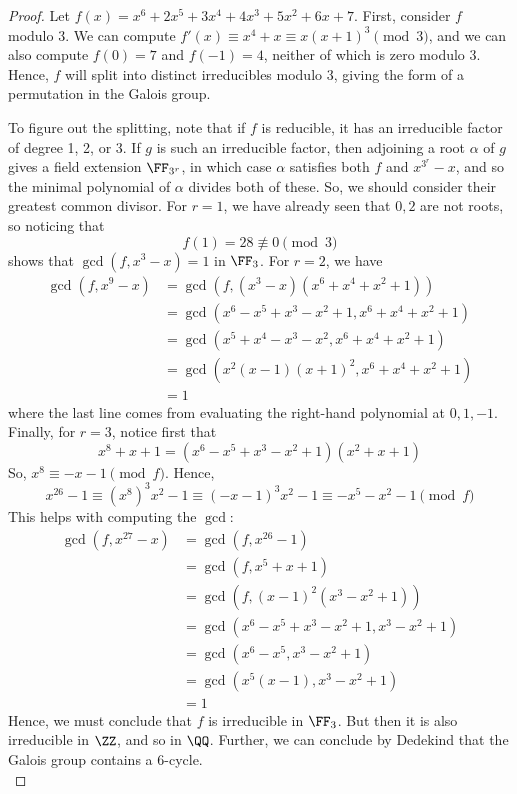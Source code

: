 \begin{proof}
	Let $f(x) = x^6+2x^5+3x^4+4x^3+5x^2+6x+7$. First, consider $f$ modulo 3. We can compute $f'(x) \equiv x^4+x \equiv x(x+1)^3 \pmod{3}$, and we can also compute $f(0) = 7$ and $f(-1) = 4$, neither of which is zero modulo $3$. Hence, $f$ will split into distinct irreducibles modulo 3, giving the form of a permutation in the Galois group.
	
	To figure out the splitting, note that if $f$ is reducible, it has an irreducible factor of degree 1, 2, or 3. If $g$ is such an irreducible factor, then adjoining a root $\alpha$ of $g$ gives a field extension $\FF_{3^r}$, in which case $\alpha$ satisfies both $f$ and $x^{3^r}-x$, and so the minimal polynomial of $\alpha$ divides both of these. So, we should consider their greatest common divisor. For $r=1$, we have already seen that $0,2$ are not roots, so noticing that
	\[ f(1) = 28 \not\equiv 0 \pmod{3} \]
	shows that $\gcd(f,x^3-x) = 1$ in $\FF_3$. For $r=2$, we have
	\begin{align*}
	\gcd(f,x^9-x)
		&= \gcd(f,(x^3-x)(x^6+x^4+x^2+1)) \\
		&= \gcd(x^6-x^5+x^3-x^2+1,x^6+x^4+x^2+1) \\
		&= \gcd(x^5+x^4-x^3-x^2,x^6+x^4+x^2+1) \\
		&= \gcd(x^2(x-1)(x+1)^2,x^6+x^4+x^2+1) \\
		&= 1
	\end{align*}
	where the last line comes from evaluating the right-hand polynomial at $0,1,-1$. Finally, for $r=3$, notice first that
	\[ x^8+x+1 = (x^6-x^5+x^3-x^2+1)(x^2+x+1) \]
	So, $x^8 \equiv -x-1 \pmod{f}$. Hence,
	\[ x^{26} - 1 \equiv (x^8)^3x^2 - 1 \equiv (-x-1)^3x^2-1 \equiv -x^5-x^2-1 \pmod{f} \]
	This helps with computing the $\gcd$:
	\begin{align*}
	\gcd(f,x^{27}-x)
		&= \gcd(f,x^{26}-1) \\
		&= \gcd(f,x^5+x+1) \\
		&= \gcd(f,(x-1)^2(x^3-x^2+1)) \\
		&= \gcd(x^6-x^5+x^3-x^2+1,x^3-x^2+1) \\
		&= \gcd(x^6-x^5,x^3-x^2+1) \\
		&= \gcd(x^5(x-1),x^3-x^2+1) \\
		&= 1
	\end{align*}
	Hence, we must conclude that $f$ is irreducible in $\FF_3$. But then it is also irreducible in $\ZZ$, and so in $\QQ$. Further, we can conclude by Dedekind that the Galois group contains a $6$-cycle. \\
	

\end{proof}

